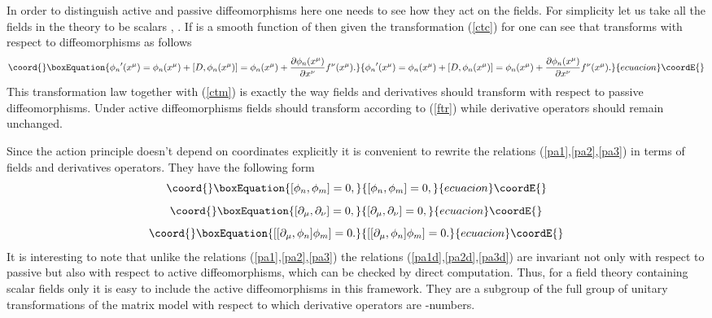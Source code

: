\documentclass[a4paper,11pt]{article}
\begin{document}
In order to distinguish active and passive diffeomorphisms here
one needs to see how they act on the fields. For simplicity let us
take all the fields in the theory to be scalars \coordHE{},
\coordHE{}. If \coordHE{} is a smooth function of \coordHE{} then
given the transformation (\ref{ctc}) for \coordHE{} one can see that
\coordHE{} transforms with respect to diffeomorphisms as
follows
\begin{equation}\coord{}\boxEquation{
{\phi_n}' (x^\mu)=\phi_n (x^\mu)+[D,\phi_n (x^\mu)]=\phi_n
(x^\mu)+\frac{\partial \phi_n (x^\mu)}{\partial
x^\nu}f^\nu(x^\mu). \label{ftr}
}{
{\phi_n}' (x^\mu)=\phi_n (x^\mu)+[D,\phi_n (x^\mu)]=\phi_n
(x^\mu)+\frac{\partial \phi_n (x^\mu)}{\partial
x^\nu}f^\nu(x^\mu). }{ecuacion}\coordE{}\end{equation}
This transformation law together with (\ref{ctm}) is exactly the
way fields and derivatives should transform with respect to
passive diffeomorphisms. Under active diffeomorphisms fields
should transform according to (\ref{ftr}) while derivative
operators should remain unchanged.


Since the action principle doesn't depend on coordinates
explicitly it is convenient to rewrite the relations
(\ref{pa1},\ref{pa2},\ref{pa3}) in terms of fields and derivatives
operators. They have the following form
\begin{equation}\coord{}\boxEquation{
[\phi_n,\phi_m]=0, \label{pa1d}
}{
[\phi_n,\phi_m]=0, }{ecuacion}\coordE{}\end{equation}
\begin{equation}\coord{}\boxEquation{
[\partial_\mu,\partial_\nu]=0, \label{pa2d}
}{
[\partial_\mu,\partial_\nu]=0, }{ecuacion}\coordE{}\end{equation}
\begin{equation}\coord{}\boxEquation{
[[\partial_\mu,\phi_n]\phi_m]=0. \label{pa3d}
}{
[[\partial_\mu,\phi_n]\phi_m]=0. }{ecuacion}\coordE{}\end{equation}
It is interesting to note that unlike the relations
(\ref{pa1},\ref{pa2},\ref{pa3}) the relations
(\ref{pa1d},\ref{pa2d},\ref{pa3d}) are invariant not only with
respect to passive but also with respect to active
diffeomorphisms, which can be checked by direct computation. Thus,
for a field theory containing scalar fields only it is easy to
include the active diffeomorphisms in this framework. They are a
subgroup of the full group of unitary transformations of the
matrix model with respect to which derivative operators are
\coordHE{}-numbers.
\end{document}

